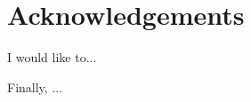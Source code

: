 




\begingroup

\let\clearpage\relax
\let\cleardoublepage\relax
\let\cleardoublepage\relax

\chapter*{Acknowledgements} %



\noindent I would like to...

\vspace{3mm}

\noindent Finally, ...


\endgroup